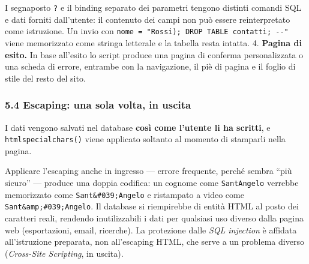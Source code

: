 \documentclass[
  11pt,
]{article}
\newenvironment{Shaded}{\begin{snugshade}}{\end{snugshade}}
\newcommand{\NormalTok}[1]{#1}
\newcommand{\OperatorTok}[1]{\textcolor[rgb]{0.81,0.36,0.00}{\textbf{#1}}}
\newcommand{\OtherTok}[1]{\textcolor[rgb]{0.56,0.35,0.01}{#1}}
\newcommand{\StringTok}[1]{\textcolor[rgb]{0.31,0.60,0.02}{#1}}
\newcommand{\VariableTok}[1]{\textcolor[rgb]{0.00,0.00,0.00}{#1}}
\begin{document}
\begin{Shaded}
\end{Shaded}

I segnaposto \texttt{?} e il binding separato dei parametri tengono
distinti comandi SQL e dati forniti dall'utente: il contenuto dei campi
non può essere reinterpretato come istruzione. Un invio con
\texttt{nome\ =\ "Rossi\textquotesingle{});\ DROP\ TABLE\ contatti;\ -\/-"}
viene memorizzato come stringa letterale e la tabella resta intatta. 4.
\textbf{Pagina di esito.} In base all'esito lo script produce una pagina
di conferma personalizzata o una scheda di errore, entrambe con la
navigazione, il piè di pagina e il foglio di stile del resto del sito.

\hypertarget{escaping-una-sola-volta-in-uscita}{%
\subsubsection{5.4 Escaping: una sola volta, in
uscita}\label{escaping-una-sola-volta-in-uscita}}

I dati vengono salvati nel database \textbf{così come l'utente li ha
scritti}, e \texttt{htmlspecialchars()} viene applicato soltanto al
momento di stamparli nella pagina.

Applicare l'escaping anche in ingresso --- errore frequente, perché
sembra ``più sicuro'' --- produce una doppia codifica: un cognome come
\texttt{Sant\textquotesingle{}Angelo} verrebbe memorizzato come
\texttt{Sant\&\#039;Angelo} e ristampato a video come
\texttt{Sant\&amp;\#039;Angelo}. Il database si riempirebbe di entità
HTML al posto dei caratteri reali, rendendo inutilizzabili i dati per
qualsiasi uso diverso dalla pagina web (esportazioni, email, ricerche).
La protezione dalle \emph{SQL injection} è affidata all'istruzione
preparata, non all'escaping HTML, che serve a un problema diverso
(\emph{Cross-Site Scripting}, in uscita).
\end{document}
